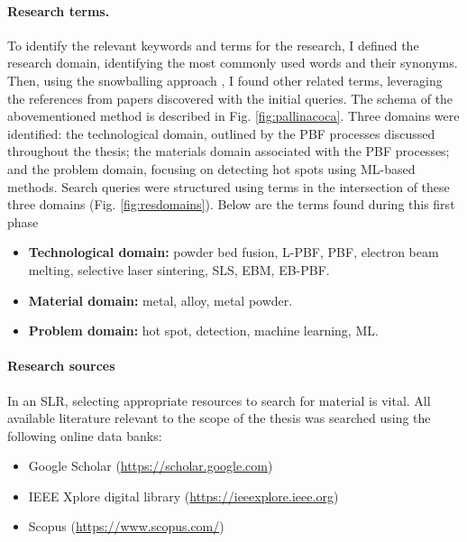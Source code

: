\paragraph{Research terms.}
To identify the relevant keywords and terms for the research, I defined the research domain, identifying the most commonly used words and their synonyms. Then, using the snowballing approach \cite{wohlin_guidelines_2014}, I found other related terms, leveraging the references from papers discovered with the initial queries. The schema of the abovementioned method is described in Fig. \ref{fig:pallinacoca}. Three domains were identified: the technological domain, outlined by the PBF processes discussed throughout the thesis; the materials domain associated with the PBF processes; and the problem domain, focusing on detecting hot spots using ML-based methods. Search queries were structured using terms in the intersection of these three domains (Fig. \ref{fig:resdomains}). Below are the terms found during this first phase
\begin{itemize}
    \item \textbf{Technological domain:} powder bed fusion, L-PBF, PBF, electron beam melting, selective laser sintering, SLS, EBM, EB-PBF.
    \item \textbf{Material domain:} metal, alloy, metal powder.
    \item \textbf{Problem domain:} hot spot, detection, machine learning, ML.
\end{itemize}

\paragraph{Research sources} In an SLR, selecting appropriate resources to search for material is vital. All available literature relevant to the scope of the thesis was searched using the following online data banks:
\begin{itemize}
    \item Google Scholar (\href{https://scholar.google.com}{https://scholar.google.com})
    \item IEEE Xplore digital library (\href{https://ieeexplore.ieee.org}{https://ieeexplore.ieee.org})
    \item Scopus (\href{https://www.scopus.com/}{https://www.scopus.com/})
\end{itemize}

